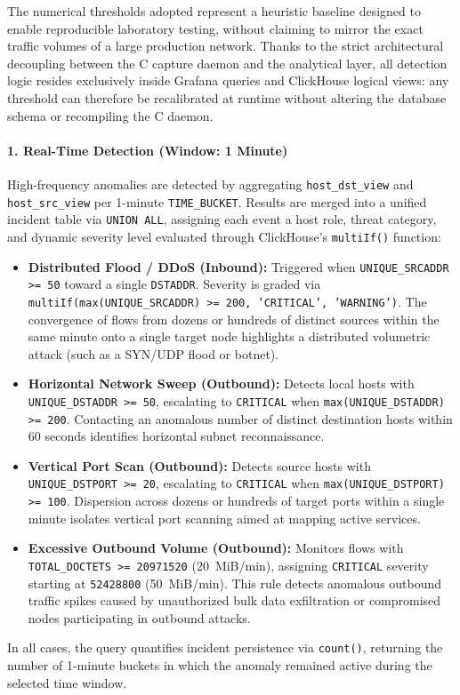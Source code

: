 \documentclass[11pt,a4paper]{article}
\begin{document}
The numerical thresholds adopted represent a heuristic baseline designed to enable reproducible laboratory testing, without claiming to mirror the exact traffic volumes of a large production network. Thanks to the strict architectural decoupling between the C capture daemon and the analytical layer, all detection logic resides exclusively inside Grafana queries and ClickHouse logical views: any threshold can therefore be recalibrated at runtime without altering the database schema or recompiling the C daemon.

\paragraph{1. Real-Time Detection (Window: 1 Minute)}
High-frequency anomalies are detected by aggregating \texttt{host\_dst\_view} and \texttt{host\_src\_view} per 1-minute \texttt{TIME\_BUCKET}. Results are merged into a unified incident table via \texttt{UNION ALL}, assigning each event a host role, threat category, and dynamic severity level evaluated through ClickHouse's \texttt{multiIf()} function:
\begin{itemize}
    \item \textbf{Distributed Flood / DDoS (Inbound):} Triggered when \texttt{UNIQUE\_SRCADDR >= 50} toward a single \texttt{DSTADDR}. Severity is graded via \texttt{multiIf(max(UNIQUE\_SRCADDR) >= 200, 'CRITICAL', 'WARNING')}. The convergence of flows from dozens or hundreds of distinct sources within the same minute onto a single target node highlights a distributed volumetric attack (such as a SYN/UDP flood or botnet).
    \item \textbf{Horizontal Network Sweep (Outbound):} Detects local hosts with \texttt{UNIQUE\_DSTADDR >= 50}, escalating to \texttt{CRITICAL} when \texttt{max(UNIQUE\_DSTADDR) >= 200}. Contacting an anomalous number of distinct destination hosts within 60 seconds identifies horizontal subnet reconnaissance.
    \item \textbf{Vertical Port Scan (Outbound):} Detects source hosts with \texttt{UNIQUE\_DSTPORT >= 20}, escalating to \texttt{CRITICAL} when \texttt{max(UNIQUE\_DSTPORT) >= 100}. Dispersion across dozens or hundreds of target ports within a single minute isolates vertical port scanning aimed at mapping active services.
    \item \textbf{Excessive Outbound Volume (Outbound):} Monitors flows with \texttt{TOTAL\_DOCTETS >= 20971520} (20~MiB/min), assigning \texttt{CRITICAL} severity starting at \texttt{52428800} (50~MiB/min). This rule detects anomalous outbound traffic spikes caused by unauthorized bulk data exfiltration or compromised nodes participating in outbound attacks.
\end{itemize}
In all cases, the query quantifies incident persistence via \texttt{count()}, returning the number of 1-minute buckets in which the anomaly remained active during the selected time window.
\end{document}
